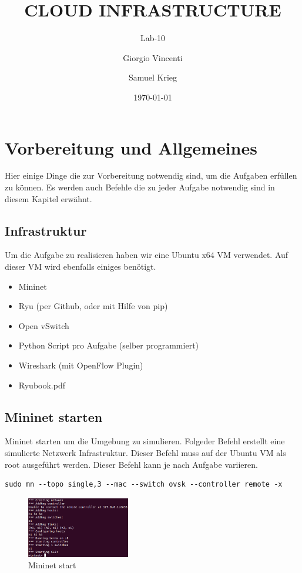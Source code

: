 \documentclass[a4,12pt]{scrartcl}
\title{CLOUD INFRASTRUCTURE}
\subtitle{Lab-10}
\author{Giorgio Vincenti \and Samuel Krieg}
\date{\today}
\begin{document}
\clearpage\maketitle
\thispagestyle{empty}
\tableofcontents
\newpage

\section{Vorbereitung und Allgemeines}
Hier einige Dinge die zur Vorbereitung notwendig sind, um die Aufgaben erfüllen zu können. Es werden auch Befehle die zu jeder Aufgabe notwendig sind in diesem Kapitel erwähnt. 

\subsection{Infrastruktur}
Um die Aufgabe zu realisieren haben wir eine Ubuntu x64 VM verwendet. 
Auf dieser VM wird ebenfalls einiges benötigt. 
\begin{itemize}
\item Mininet 
\item Ryu (per Github, oder mit Hilfe von pip) 
\item Open vSwitch
\item Python Script pro Aufgabe (selber programmiert) 
\item Wireshark (mit OpenFlow Plugin)
\item Ryubook.pdf 
\end{itemize}

\subsection{Mininet starten}
Mininet starten um die Umgebung zu simulieren. Folgeder Befehl erstellt eine simulierte Netzwerk Infrastruktur. Dieser Befehl muss auf der Ubuntu VM als root ausgeführt werden. Dieser Befehl kann je nach Aufgabe variieren. 
\begin{lstlisting}
sudo mn --topo single,3 --mac --switch ovsk --controller remote -x
\end{lstlisting}
\begin{figure} [H]
	\begin{center}
	\includegraphics[width=0.40\textwidth]{./pictures/mininet.png}
	\caption{Mininet start}
	\label{x}
	\end{center}
\end{figure} 
\end{document}
